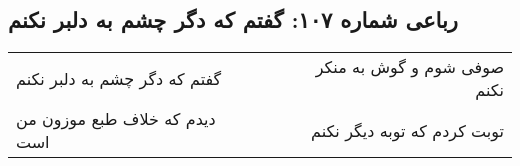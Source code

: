 \begin{center}
\section*{رباعی شماره ۱۰۷: گفتم که دگر چشم به دلبر نکنم}
\label{sec:107}
\begin{longtable}{l p{0.5cm} r}
گفتم که دگر چشم به دلبر نکنم
&&
صوفی شوم و گوش به منکر نکنم
\\
دیدم که خلاف طبع موزون من است
&&
توبت کردم که توبه دیگر نکنم
\\
\end{longtable}
\end{center}
